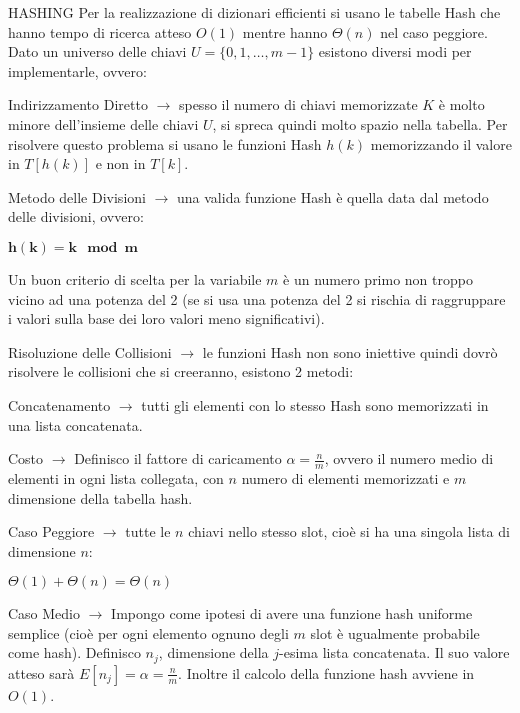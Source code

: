 \documentclass[8pt]{extarticle}
\begin{document}
\begin{formulario}
		\begin{myParagraph}{HASHING}
Per la realizzazione di dizionari efficienti si usano le tabelle Hash che hanno tempo di ricerca atteso $O(1)$ mentre hanno $\Theta(n)$ nel caso peggiore. Dato un universo delle chiavi $U=\{ 0,1,\dots,m-1 \}$ esistono diversi modi per implementarle, ovvero:
			\begin{descr}{0}
				\item[Indirizzamento Diretto] $\rightarrow$ spesso il numero di chiavi memorizzate $K$ è molto minore dell'insieme delle chiavi $U$, si spreca quindi molto spazio nella tabella. Per risolvere questo problema si usano le funzioni Hash $h(k)$ memorizzando il valore in $T[h(k)]$ e non in $T[k]$. 
					\begin{descr}{0}
						\item[Metodo delle Divisioni] $\rightarrow$ una valida funzione Hash è quella data dal metodo delle divisioni, ovvero:
							\begin{tcenter}
								$\bm{h(k)=k \mod m}$
							\end{tcenter} 
Un buon criterio di scelta per la variabile $m$ è un numero primo non troppo vicino ad una potenza del 2 (se si usa una potenza del 2 si rischia di raggruppare i valori sulla base dei loro valori meno significativi).
						\item[Risoluzione delle Collisioni] $\rightarrow$ le funzioni Hash non sono iniettive quindi dovrò risolvere le collisioni che si creeranno, esistono 2 metodi: 
						\begin{descr}{0}
							\item[Concatenamento] $\rightarrow$ tutti gli elementi con lo stesso Hash sono memorizzati in una lista concatenata. 
							\begin{descr}{0}
								\item[Costo] $\rightarrow$ Definisco il fattore di caricamento $\alpha=\frac{n}{m}$, ovvero il numero medio di elementi in ogni lista collegata, con $n$ numero di elementi memorizzati e $m$ dimensione della tabella hash.
								\begin{descr}{0}
									\item[Caso Peggiore] $\rightarrow$ tutte le $n$ chiavi nello stesso slot, cioè si ha una singola lista di dimensione $n$:
									\begin{tcenter}
										$\Theta(1)+\Theta(n)=\Theta(n)$
									\end{tcenter}
									\item[Caso Medio] $\rightarrow$ Impongo come ipotesi di avere una funzione hash uniforme semplice (cioè per ogni elemento ognuno degli $m$ slot è ugualmente probabile come hash). Definisco $n_j$, dimensione della $j$-esima lista concatenata. Il suo valore atteso sarà $E[n_j]=\alpha=\frac{n}{m}$. Inoltre il calcolo della funzione hash avviene in $O(1)$.

\end{descr}
\end{descr}
\end{descr}
\end{descr}
\end{descr}
\end{myParagraph}
\end{formulario}
\end{document}
